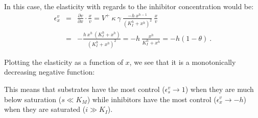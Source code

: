 \documentclass[12pt,a4paper]{article}
\begin{document}
In this case, the elasticity with regards to the inhibitor concentration would be:
\begin{eqnarray}
    \epsilon_x^v &=& \frac{\partial v}{\partial x}\cdot\frac{x}{v} = V^+ ~ \kappa ~ \gamma ~ \frac{- h ~ x^{h-1}}{(K_I^h + x^h)^2} ~ \frac{x}{v} \nonumber \\
    &=& -\frac{h ~ x^h ~ (K_I^h + x^h)}{(K_I^h + x^h)^2} = -h ~ \frac{x^h}{K_I^h + x^h} = -h (1 - \theta)~. \label{eq:eps_inh}
\end{eqnarray}

Plotting the elasticity as a function of $x$, we see that it is a monotonically decreasing negative function:

\begin{center}
\end{center}

This means that substrates have the most control ($\epsilon_s^v \rightarrow 1$) when they are much below saturation ($s \ll K_M$) while inhibitors have the most control ($\epsilon_x^v \rightarrow -h$) when they are saturated ($i \gg K_I$).
\end{document}
